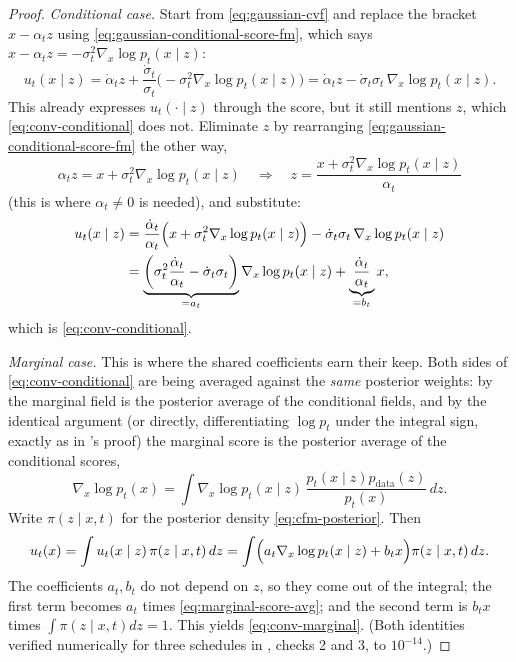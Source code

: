 \documentclass[11pt,a4paper]{report}
\theoremstyle{definition}
\theoremstyle{remark}
\begin{document}
\begin{proof}
\emph{Conditional case.} Start from \eqref{eq:gaussian-cvf} and replace the
bracket $x-\alpha_tz$ using \eqref{eq:gaussian-conditional-score-fm}, which
says $x-\alpha_tz = -\sigma_t^2\nabla_x\log p_t(x\mid z)$:
\[
u_t(x\mid z)
= \dot\alpha_t z + \frac{\dot\sigma_t}{\sigma_t}\bigl(-\sigma_t^2\nabla_x\log p_t(x\mid z)\bigr)
= \dot\alpha_t z - \dot\sigma_t\sigma_t\,\nabla_x\log p_t(x\mid z) .
\]
This already expresses $u_t(\cdot\mid z)$ through the score, but it still
mentions $z$, which \eqref{eq:conv-conditional} does not. Eliminate $z$ by
rearranging \eqref{eq:gaussian-conditional-score-fm} the other way,
\[
\alpha_tz = x + \sigma_t^2\nabla_x\log p_t(x\mid z)
\quad\Longrightarrow\quad
z = \frac{x+\sigma_t^2\nabla_x\log p_t(x\mid z)}{\alpha_t}
\]
(this is where $\alpha_t\neq0$ is needed), and substitute:
\begin{align*}
u_t(x\mid z)
&= \frac{\dot\alpha_t}{\alpha_t}\Bigl(x+\sigma_t^2\nabla_x\log p_t(x\mid z)\Bigr)
   - \dot\sigma_t\sigma_t\,\nabla_x\log p_t(x\mid z)\\
&= \underbrace{\left(\sigma_t^2\frac{\dot\alpha_t}{\alpha_t}-\dot\sigma_t\sigma_t\right)}_{=a_t}\nabla_x\log p_t(x\mid z)
 + \underbrace{\frac{\dot\alpha_t}{\alpha_t}}_{=b_t}x ,
\end{align*}
which is \eqref{eq:conv-conditional}.

\emph{Marginal case.} This is where the shared coefficients earn their
keep. Both sides of \eqref{eq:conv-conditional} are being averaged against
the \emph{same} posterior weights: by
 the marginal field is the posterior
average of the conditional fields, and by the identical argument (or
directly, differentiating $\log p_t$ under the integral sign, exactly as in
's proof) the marginal score is the posterior
average of the conditional scores,
\begin{equation}
\label{eq:marginal-score-avg}
\nabla_x\log p_t(x) = \int\nabla_x\log p_t(x\mid z)\,\frac{p_t(x\mid z)p_{\mathrm{data}}(z)}{p_t(x)}\,dz .
\end{equation}
Write $\pi(z\mid x,t)$ for the posterior density \eqref{eq:cfm-posterior}.
Then
\[
u_t(x)
= \int u_t(x\mid z)\,\pi(z\mid x,t)\,dz
= \int\Bigl(a_t\nabla_x\log p_t(x\mid z) + b_tx\Bigr)\pi(z\mid x,t)\,dz .
\]
The coefficients $a_t,b_t$ do not depend on $z$, so they come out of the
integral; the first term becomes $a_t$ times
\eqref{eq:marginal-score-avg}; and the second term is $b_tx$ times
$\int\pi(z\mid x,t)dz = 1$. This yields \eqref{eq:conv-marginal}.
(Both identities verified numerically for three schedules in
, checks 2 and 3, to $10^{-14}$.)
\end{proof}
\end{document}
